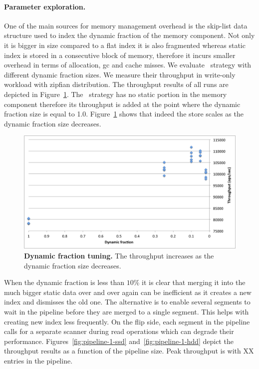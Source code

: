 {\paragraph{Parameter exploration.}
One of the main sources for memory management overhead is the skip-list data structure used to index the dynamic fraction of the memory component.
Not only it is bigger in size compared to a flat index it is also fragmented whereas static index is stored in a consecutive block of memory, therefore it incurs smaller overhead in terms of allocation, gc and cache misses.
We evaluate \basic\ strategy with different dynamic fraction sizes. We measure their throughput in write-only workload with zipfian distribution.
The throughput results of all runs are depicted in  Figure~\ref{fig:dynamic-fraction}. 
The \none\ strategy has no static portion in the memory component therefore its throughput is added at the point where the dynamic fraction size is equal to 1.0.
Figure~\ref{fig:dynamic-fraction} shows that indeed the store scales as the dynamic fraction size decreases. 

\begin{figure}[htb]
\includegraphics[width=\figw]{Figs/dynamic-fraction-1.png}
\caption{{\bf Dynamic fraction tuning.} The throughput increases as the dynamic fraction size decreases.
}
\label{fig:dynamic-fraction}
\end{figure}

When the dynamic fraction is less than $10\%$ it is clear that merging it into the much bigger static data over and over again can be inefficient as it creates a new index and dismisses the old one. 
The alternative is to enable several segments to wait in the pipeline before they are merged to a single segment. This helps with creating new index less frequently.
On the flip side, each segment in the pipeline calls for a separate scanner during read operations which can degrade their performance.
Figures~\ref{fig:pipeline-1-ssd} and~\ref{fig:pipeline-1-hdd} depict the throughput results as a function of the pipeline size. Peak throughput is with XX entries in the pipeline.

}
